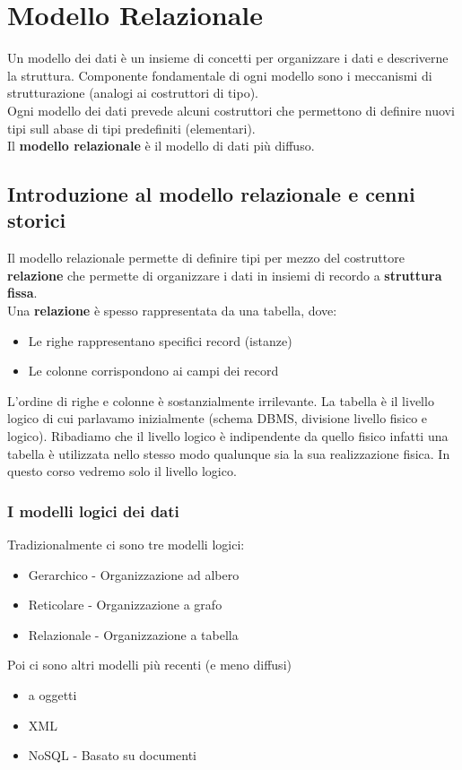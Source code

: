\chapter{Modello Relazionale}
\label{sec:Modello_relazionale}
Un modello dei dati è un insieme di concetti per organizzare i dati e 
descriverne la struttura.
Componente fondamentale di ogni modello sono i meccanismi di strutturazione 
(analogi ai costruttori di tipo).
\\ Ogni modello dei dati prevede alcuni costruttori che permettono di definire nuovi
tipi sull abase di tipi predefiniti (elementari).
\\ Il \textbf{modello relazionale} è il modello di dati più diffuso.
\section{Introduzione al modello relazionale e cenni storici}
Il modello relazionale permette di definire tipi per mezzo del costruttore \textbf{relazione}
 che permette di organizzare i dati in insiemi di recordo a \textbf{struttura fissa}.
 \\ Una \textbf{relazione} è spesso rappresentata da una tabella, dove:
 \begin{itemize}
    \item Le righe rappresentano specifici record (istanze)
    \item Le colonne corrispondono ai campi dei record
 \end{itemize}
 L'ordine di righe e colonne è sostanzialmente irrilevante.
 La tabella è il livello logico di cui parlavamo inizialmente (schema DBMS, divisione
 livello fisico e logico). Ribadiamo che il livello logico è indipendente da quello
 fisico infatti una tabella è utilizzata nello stesso modo qualunque sia la sua realizzazione
 fisica. In questo corso vedremo solo il livello logico.
 \subsection{I modelli logici dei dati}
 Tradizionalmente ci sono tre modelli logici:
 \begin{itemize}
    \item Gerarchico - Organizzazione ad albero
    \item Reticolare - Organizzazione a grafo
    \item Relazionale - Organizzazione a tabella
 \end{itemize}
 Poi ci sono altri modelli più recenti (e meno diffusi)
 \begin{itemize}
    \item a oggetti
    \item XML
    \item NoSQL - Basato su documenti
 \end{itemize}

